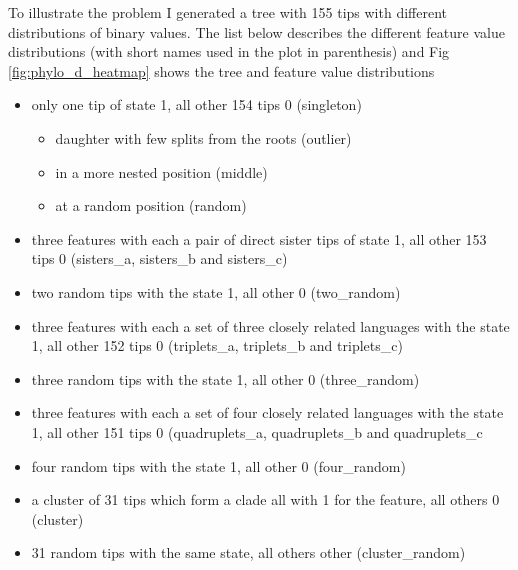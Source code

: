 \documentclass[12pt,letterpaper]{article}
\begin{document}
To illustrate the problem I generated a tree with 155 tips with different distributions of binary values. The list below describes the different feature value distributions (with short names used in the plot in parenthesis) and Fig \ref{fig:phylo_d_heatmap} shows the tree and feature value distributions

\begin{itemize}
    \item only one tip of state 1, all other 154 tips 0 (singleton)
        \begin{itemize}
            \item daughter with few splits from the roots (outlier)
            \item in a more nested position (middle)
            \item at a random position (random)
        \end{itemize}
    \item three features with each a pair of direct sister tips of state 1, all other 153 tips 0 (sisters\_a, sisters\_b and sisters\_c)
    \item two random tips with the state 1, all other 0 (two\_random)
    \item three features with each a set of three closely related languages with the state 1, all other 152 tips 0 (triplets\_a, triplets\_b and triplets\_c)
    \item three random tips with the state 1, all other 0 (three\_random)
   \item three features with each a set of four closely related languages with the state 1, all other 151 tips 0 (quadruplets\_a, quadruplets\_b and quadruplets\_c
    \item four random tips with the state 1, all other 0 (four\_random)
    \item a cluster of 31 tips which form a clade all with 1 for the feature, all others 0 (cluster)
    \item 31 random tips with the same state, all others other (cluster\_random)
\end{itemize}
\end{document}
